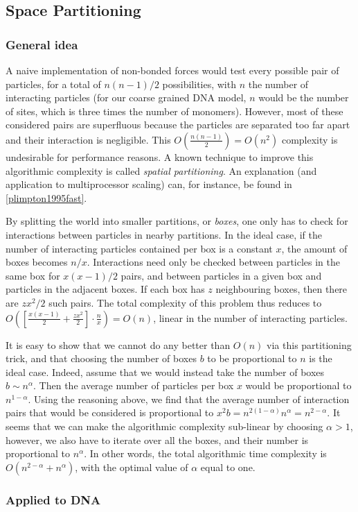 \subsection{Space Partitioning}

\subsubsection{General idea}
A naive implementation of non-bonded forces would test every possible pair of particles, for a total of $n(n-1)/2$ possibilities, with $n$ the number of interacting particles (for our coarse grained DNA model, $n$ would be the number of sites, which is three times the number of monomers).
However, most of these considered pairs are superfluous because the particles are separated too far apart and their interaction is negligible. This $O\left(\frac{n(n-1)}{2}\right) = O(n^2)$ complexity is undesirable for performance reasons.
A known technique to improve this algorithmic complexity is called \emph{spatial partitioning}. An explanation (and application to multiprocessor scaling) can, for instance, be found in \ref{plimpton1995fast}.

By splitting the world into smaller partitions, or \emph{boxes}, one only has to check for interactions between particles in nearby partitions.
In the ideal case, if the number of interacting particles contained per box is a constant $x$, the amount of boxes becomes $n/x$. Interactions need only be checked between particles in the same box for $x(x-1)/2$ pairs, and between particles in a given box and particles in the adjacent boxes. If each box has $z$ neighbouring boxes, then there are $zx^2/2$ such pairs. The total complexity of this problem thus reduces to 
$O\left(
	\left[ \frac{x(x-1)}{2} + \frac{zx^2}{2} \right]
		\cdot \frac{n}{x}
\right) = O(n)$,
linear in the number of interacting particles.

It is easy to show that we cannot do any better than $O(n)$ via this partitioning trick, and that choosing the number of boxes $b$ to be proportional to $n$ is the ideal case.
Indeed, assume that we would instead take the number of boxes $b \sim n^\alpha$. Then the average number of particles per box $x$ would be proportional to $n^{1 - \alpha}$. Using the reasoning above, we find that the average number of interaction pairs that would be considered is proportional to $x^2 b = n^{2(1 - \alpha)} n^\alpha = n^{2 -\alpha}$. It seems that we can make the algorithmic complexity sub-linear by choosing $\alpha > 1$, however, we also have to iterate over all the boxes, and their number is proportional to $n^\alpha$. In other words, the total algorithmic time complexity is $O(n^{2 - \alpha} + n^\alpha)$, with the optimal value of $\alpha$ equal to one.


\subsubsection{Applied to DNA}

